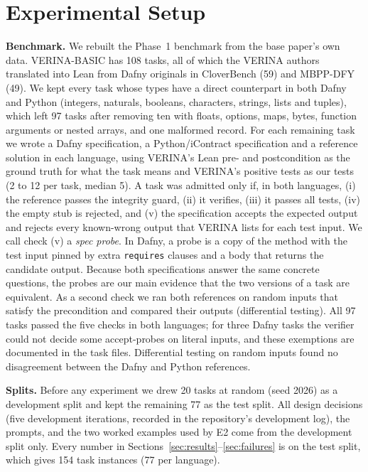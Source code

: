\section{Experimental Setup}
\label{sec:setup}

\textbf{Benchmark.} We rebuilt the Phase~1 benchmark from the base paper's own data. VERINA-BASIC has 108 tasks, all of which the VERINA authors translated into Lean from Dafny originals in CloverBench (59) and MBPP-DFY (49). We kept every task whose types have a direct counterpart in both Dafny and Python (integers, naturals, booleans, characters, strings, lists and tuples), which left 97 tasks after removing ten with floats, options, maps, bytes, function arguments or nested arrays, and one malformed record. For each remaining task we wrote a Dafny specification, a Python/iContract specification and a reference solution in each language, using VERINA's Lean pre- and postcondition as the ground truth for what the task means and VERINA's positive tests as our tests (2 to 12 per task, median 5). A task was admitted only if, in both languages, (i) the reference passes the integrity guard, (ii) it verifies, (iii) it passes all tests, (iv) the empty stub is rejected, and (v) the specification accepts the expected output and rejects every known-wrong output that VERINA lists for each test input. We call check (v) a \emph{spec probe}. In Dafny, a probe is a copy of the method with the test input pinned by extra \texttt{requires} clauses and a body that returns the candidate output. Because both specifications answer the same concrete questions, the probes are our main evidence that the two versions of a task are equivalent. As a second check we ran both references on random inputs that satisfy the precondition and compared their outputs (differential testing). All 97 tasks passed the five checks in both languages; for three Dafny tasks the verifier could not decide some accept-probes on literal inputs, and these exemptions are documented in the task files. Differential testing on  random inputs found no disagreement between the Dafny and Python references.

\textbf{Splits.} Before any experiment we drew 20 tasks at random (seed 2026) as a development split and kept the remaining 77 as the test split. All design decisions (five development iterations, recorded in the repository's development log), the prompts, and the two worked examples used by E2 come from the development split only. Every number in Sections~\ref{sec:results}--\ref{sec:failures} is on the test split, which gives 154 task instances (77 per language).

